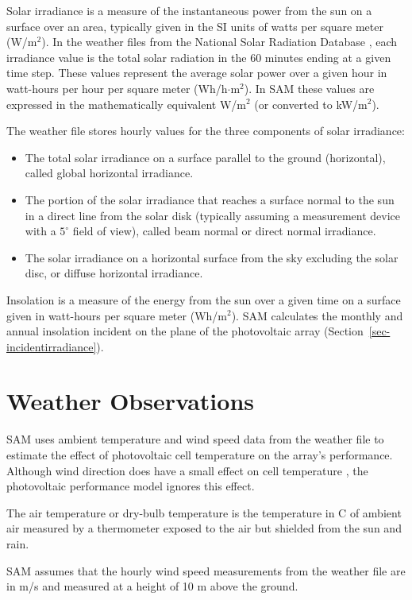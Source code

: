 \documentclass[12pt,letterpaper]{article}
\begin{document}
Solar irradiance is a measure of the instantaneous power from the sun on a surface over an area, typically given in the SI units of watts per square meter (W/m$^2$). In the weather files from the National Solar Radiation Database \citep{nsrdb}, each irradiance value is the total solar radiation in the 60 minutes ending at a given time step. These values represent the average solar power over a given hour in watt-hours per hour per square meter (Wh/h$\cdot$m$^2$). In SAM these values are expressed in the mathematically equivalent W/m$^2$ (or converted to kW/m$^2$).

The weather file stores hourly values for the three components of solar irradiance:

\begin{itemize}
\item The total solar irradiance on a surface parallel to the ground (horizontal), called global horizontal irradiance.
\item The portion of the solar irradiance that reaches a surface normal to the sun in a direct line from the solar disk (typically assuming a measurement device with a $5^{\circ}$ field of view), called beam normal or direct normal irradiance.
\item The solar irradiance on a horizontal surface from the sky excluding the solar disc, or diffuse horizontal irradiance.
\end{itemize}

Insolation is a measure of the energy from the sun over a given time on a surface given in watt-hours per square meter (Wh/m$^2$). SAM calculates the monthly and annual insolation incident on the plane of the photovoltaic array (Section~\ref{sec-incidentirradiance}). 

\section{Weather Observations}

SAM uses ambient temperature and wind speed data from the weather file to estimate the effect of photovoltaic cell temperature on the array's performance. Although wind direction does have a small effect on cell temperature \citep{king2004}, the photovoltaic performance model ignores this effect.

The air temperature or dry-bulb temperature is the temperature in \degree C of ambient air measured by a thermometer exposed to the air but shielded from the sun and rain. 

SAM assumes that the hourly wind speed measurements from the weather file are in m/s and measured at a height of 10 m above the ground.
\end{document}
